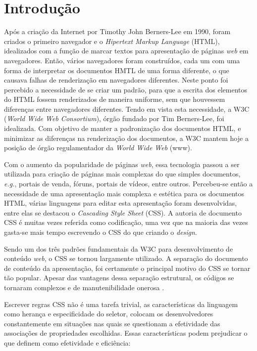 %
%

\chapter{Introdução}\label{chap:introducao}

Após a criação da Internet por Timothy John Berners-Lee em 1990, foram criados o primeiro navegador e o \textit{Hipertext Markup Language} (HTML), idealizados com a função de marcar textos para apresentação de páginas \textit{web} em navegadores. Então, vários navegadores foram construídos, cada um com uma forma de interpretar os documentos HMTL de uma forma diferente, o que causava falhas de renderização em navegadores diferentes. Neste ponto foi percebido a necessidade de se criar um padrão, para que a escrita dos elementos do HTML fossem renderizados de maneira uniforme, sem que houvessem diferenças entre navegadores diferentes. Tendo em vista esta necessidade,  a W3C (\textit{World Wide Web Consortium}), órgão fundado por Tim Berners-Lee, foi idealizada. Com objetivo de manter a padronização dos documentos HTML, e minimizar as diferenças na renderização dos documentos, a W3C mantem hoje a posição de órgão regulamentador  da \textit{World Wide Web} (www).

Com o aumento da popularidade de páginas \textit{web}, essa tecnologia passou a ser utilizada para criação de páginas mais complexas do que simples documentos, \textit{e.g.}, portais de venda, fóruns, portais de vídeos, entre outros. Percebeu-se então a necessidade de uma apresentação mais complexa e estética para os documentos HTML, várias linguagens para editar esta apresentação foram desenvolvidas, entre elas se destacou o \textit{Cascading Style Sheet} (CSS). A autoria de documento CSS é muitas vezes referida como codificação, uma vez que na maioria das vezes gasta-se mais tempo escrevendo o CSS do que criando o \textit{design}.

Sendo um dos três padrões fundamentais da W3C para desenvolvimento de conteúdo \textit{web}, o CSS se tornou largamente utilizado. A separação do documento de conteúdo da apresentação, foi certamente o principal motivo do CSS se tornar tão popular. Apesar das vantagens dessa separação estrutural, os códigos se tornaram complexos e de manutenibilidade onerosa \cite{Mesbah2012}.

Escrever regras CSS não é uma tarefa trivial, as características da linguagem como herança e especificidade do seletor, colocam os desenvolvedores constantemente em situações nas quais se questionam a efetividade das associações de propriedades escolhidas.
Essas características podem prejudicar o que  definem como efetividade e eficiência:

